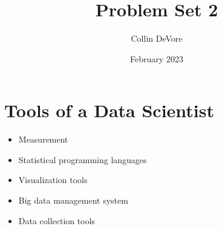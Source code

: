 \documentclass{article}
\title{Problem Set 2}
\author{Collin DeVore}
\date{February 2023}
\begin{document}
\maketitle

\section*{Tools of a Data Scientist}
\begin{itemize}
    \item Measurement
    \item Statistical programming languages
    \item Visualization tools
    \item Big data management system
    \item Data collection tools
\end{itemize}
\end{document}
